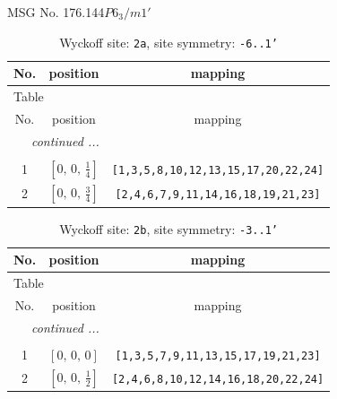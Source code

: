 \documentclass[fleqn,8pt]{jsarticle}
\begin{document}
\setcounter{MaxMatrixCols}{32}

\renewcommand{\tablename}{Table~}
\renewcommand{\figurename}{Figure~}
\begin{center}
\LARGE
MSG No. 176.144\quad$P6_{3}/m1'$
\end{center}
\renewcommand{\arraystretch}{1.2}
\begin{longtable}{ccc}
\caption{Wyckoff site: {\tt 2a}, site symmetry: {\tt -6..1'}}
 \\
 \hline \hline
No. & position & mapping \\ \hline \endfirsthead

\multicolumn{2}{l}{\tablename\ \thetable{}} \\
 \hline \hline
No. & position & mapping \\ \hline \endhead

 \hline \hline
\multicolumn{2}{r}{\footnotesize\it continued ...} \\ \endfoot

 \hline \hline
\multicolumn{2}{r}{} \\ \endlastfoot

1 & $\left[ 0,\, 0,\, \frac{1}{4} \right]$ & {\tt [1,3,5,8,10,12,13,15,17,20,22,24]} \\ \hline
2 & $\left[ 0,\, 0,\, \frac{3}{4} \right]$ & {\tt [2,4,6,7,9,11,14,16,18,19,21,23]} \\
\end{longtable}
\renewcommand{\arraystretch}{1.2}
\begin{longtable}{ccc}
\caption{Wyckoff site: {\tt 2b}, site symmetry: {\tt -3..1'}}
 \\
 \hline \hline
No. & position & mapping \\ \hline \endfirsthead

\multicolumn{2}{l}{\tablename\ \thetable{}} \\
 \hline \hline
No. & position & mapping \\ \hline \endhead

 \hline \hline
\multicolumn{2}{r}{\footnotesize\it continued ...} \\ \endfoot

 \hline \hline
\multicolumn{2}{r}{} \\ \endlastfoot

1 & $\left[ 0,\, 0,\, 0 \right]$ & {\tt [1,3,5,7,9,11,13,15,17,19,21,23]} \\ \hline
2 & $\left[ 0,\, 0,\, \frac{1}{2} \right]$ & {\tt [2,4,6,8,10,12,14,16,18,20,22,24]} \\
\end{longtable}
\end{document}
